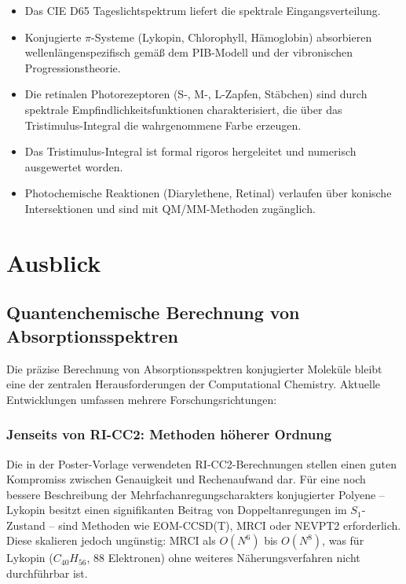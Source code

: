 ﻿\documentclass[a4paper,12pt]{article}
\theoremstyle{definition}
\begin{document}
\begin{itemize}
  \item Das CIE D65 Tageslichtspektrum liefert die spektrale Eingangsverteilung.
  \item Konjugierte $\pi$-Systeme (Lykopin, Chlorophyll, Hämoglobin) absorbieren
        wellenlängenspezifisch gemäß dem PIB-Modell und der vibronischen Progressionstheorie.
  \item Die retinalen Photorezeptoren (S-, M-, L-Zapfen, Stäbchen) sind durch
        spektrale Empfindlichkeitsfunktionen charakterisiert, die über das
        Tristimulus-Integral die wahrgenommene Farbe erzeugen.
  \item Das Tristimulus-Integral ist formal rigoros hergeleitet und numerisch
        ausgewertet worden.
  \item Photochemische Reaktionen (Diarylethene, Retinal) verlaufen über
        konische Intersektionen und sind mit QM/MM-Methoden zugänglich.
\end{itemize}

\section{Ausblick}

\subsection{Quantenchemische Berechnung von Absorptionsspektren}

Die präzise Berechnung von Absorptionsspektren konjugierter Moleküle bleibt eine
der zentralen Herausforderungen der Computational Chemistry. Aktuelle Entwicklungen
umfassen mehrere Forschungsrichtungen:

\subsubsection{Jenseits von RI-CC2: Methoden höherer Ordnung}

Die in der Poster-Vorlage verwendeten RI-CC2-Berechnungen \cite{vollbrecht2014}
stellen einen guten Kompromiss zwischen Genauigkeit und Rechenaufwand dar.
Für eine noch bessere Beschreibung der Mehrfachanregungscharakters konjugierter
Polyene -- Lykopin besitzt einen signifikanten Beitrag von Doppeltanregungen
im $S_1$-Zustand \cite{tavan1987} -- sind Methoden wie EOM-CCSD(T),
MRCI oder NEVPT2 erforderlich. Diese skalieren jedoch ungünstig:
MRCI als $O(N^6)$ bis $O(N^8)$, was für Lykopin ($C_{40}H_{56}$, 88 Elektronen)
ohne weiteres Näherungsverfahren nicht durchführbar ist.
\end{document}
